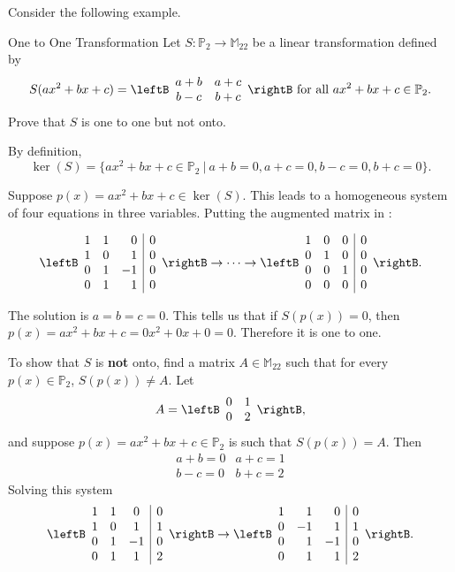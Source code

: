 Consider the following example.

\begin{example}{One to One Transformation}\label{exa:onetoonegeneral}
Let $S:\mathbb{P}_2\to\mathbb{M}_{22}$ be a linear transformation
defined by
\[ S(ax^2+bx+c)
=
\leftB\begin{array}{cc}
a+b & a+c \\ b-c & b+c \end{array}\rightB
\mbox{ for all }
 ax^2+bx+c\in \mathbb{P}_2.\]
Prove that $S$ is one to one but not onto.
\end{example}

\begin{solution}
By definition, 
\[ \ker(S)=\{ax^2+bx+c\in \mathbb{P}_2 ~|~ a+b=0,
a+c=0, b-c=0, b+c=0\}.\]

Suppose $p(x)=ax^2+bx+c\in\ker(S)$.
This leads to a homogeneous system of four equations in three 
variables.  
Putting the augmented matrix in \rref:

\[ \leftB\begin{array}{rrr|c}
1 & 1 & 0 & 0  \\
1 & 0 & 1 & 0  \\
0 & 1 & -1 & 0  \\
0 & 1 & 1 & 0  \end{array}\rightB
\rightarrow \cdots \rightarrow
\leftB\begin{array}{ccc|c}
1 & 0 & 0 & 0  \\
0 & 1 & 0 & 0  \\
0 & 0 & 1 & 0  \\
0 & 0 & 0 & 0  \end{array}\rightB. \]

The solution is $a=b=c=0$. This tells us that if $S(p(x)) = 0$, then $p(x) = ax^2+bx+c = 0x^2 + 0x + 0 = 0$. Therefore it is one to one. 

To show that $S$ is \textbf{not} onto, find a matrix $A\in\mathbb{M}_{22}$
such that for every $p(x)\in \mathbb{P}_2$, 
$S(p(x))\neq A$.
Let 
\[ A=\leftB\begin{array}{cc} 
0 & 1 \\ 0 & 2 \end{array}\rightB,\]
and suppose $p(x)=ax^2+bx+c\in \mathbb{P}_2$ is such that
$S(p(x))=A$.
Then
\[ \begin{array}{ll}
a+b=0 & a+c=1 \\ b-c=0 & b+c=2 \end{array}\]
Solving this system
\[ \leftB\begin{array}{ccc|c}
1 & 1 & 0 & 0  \\
1 & 0 & 1 & 1  \\
0 & 1 & -1 & 0  \\
0 & 1 & 1 & 2  \end{array}\rightB
\rightarrow 
\leftB\begin{array}{rrr|r}
1 & 1 & 0 & 0  \\
0 & -1 & 1 & 1  \\
0 & 1 & -1 & 0  \\
0 & 1 & 1 & 2  \end{array}\rightB. \]


\end{solution}
